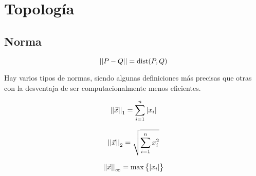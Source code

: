 \chapter{Topología}

\section{Norma}

\begin{mdframed}[style=DefinitionFrame]
    \begin{defn}
    \end{defn}
    \begin{equation*}
        {\left|\left| {P-Q} \right|\right|} = \operatorname{dist} (P,Q)
    \end{equation*}
\end{mdframed}

Hay varios tipos de normas, siendo algunas definiciones más precisas que otras con la desventaja de ser computacionalmente menos eficientes.

\begin{mdframed}[style=DefinitionFrame]
    \begin{defn}
    \end{defn}
    \begin{equation*}
        {\left|\left| {\Vec{x}} \right|\right|}_1 = \sum_{i=1}^n {\left| {x_i} \right|}
    \end{equation*}
\end{mdframed}

\begin{mdframed}[style=DefinitionFrame]
    \begin{defn}
        \label{defn:norm2}
    \end{defn}
    \begin{equation*}
        {\left|\left| {\Vec{x}} \right|\right|}_2 = \sqrt{\sum_{i=1}^n x_i^2}
    \end{equation*}
\end{mdframed}

\begin{mdframed}[style=DefinitionFrame]
    \begin{defn}
    \end{defn}
    \begin{equation*}
        {\left|\left| {\Vec{x}} \right|\right|}_\infty = \operatorname{max} \big\{ {\left| {x_i} \right|} \big\}
    \end{equation*}
\end{mdframed}


